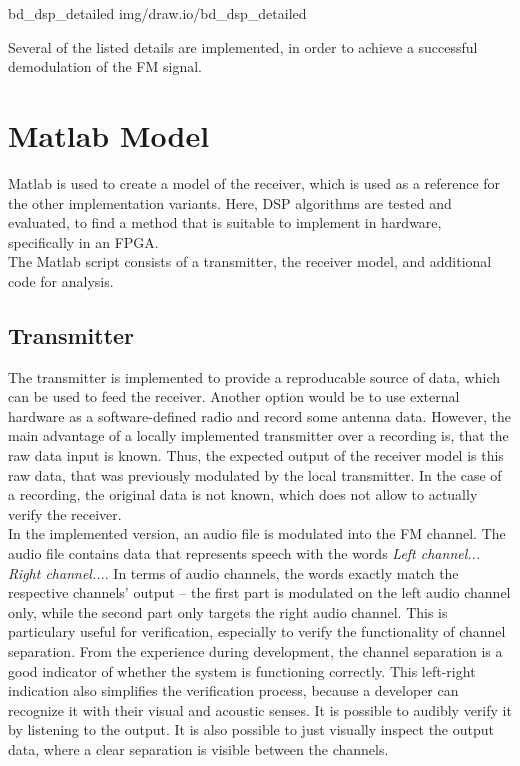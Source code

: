  {bd_dsp_detailed} {img/draw.io/bd_dsp_detailed}

\noindent
Several of the listed details are implemented, in order to achieve a successful demodulation of the FM signal.

\section{Matlab Model}

Matlab is used to create a model of the receiver, which is used as a reference for the other implementation variants.
Here, DSP algorithms are tested and evaluated, to find a method that is suitable to implement in hardware, specifically in an FPGA.\\

The Matlab script consists of a transmitter, the receiver model, and additional code for analysis.

\subsection{Transmitter}

The transmitter is implemented to provide a reproducable source of data, which can be used to feed the receiver.
Another option would be to use external hardware as a software-defined radio and record some antenna data.
However, the main advantage of a locally implemented transmitter over a recording is, that the raw data input is known.
Thus, the expected output of the receiver model is this raw data, that was previously modulated by the local transmitter.
In the case of a recording, the original data is not known, which does not allow to actually verify the receiver.\\

In the implemented version, an audio file is modulated into the FM channel.
The audio file contains data that represents speech with the words \textit{Left channel... Right channel...}.
In terms of audio channels, the words exactly match the respective channels' output -- the first part is modulated on the left audio channel only, while the second part only targets the right audio channel.
This is particulary useful for verification, especially to verify the functionality of channel separation.
From the experience during development, the channel separation is a good indicator of whether the system is functioning correctly.
This left-right indication also simplifies the verification process, because a developer can recognize it with their visual and acoustic senses.
It is possible to audibly verify it by listening to the output.
It is also possible to just visually inspect the output data, where a clear separation is visible between the channels.\\


